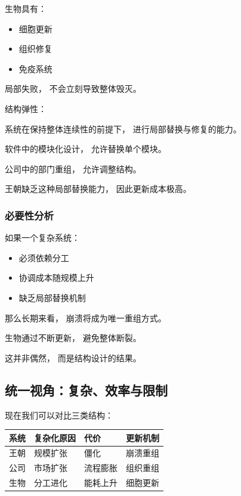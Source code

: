 \documentclass[openany, a4paper, 12pt]{book}
\begin{document}
生物具有：

\begin{itemize}
	\item 细胞更新
	\item 组织修复
	\item 免疫系统
\end{itemize}

局部失败，
不会立刻导致整体毁灭。

\begin{definitionbox}
	结构弹性：
	
	系统在保持整体连续性的前提下，
	进行局部替换与修复的能力。
\end{definitionbox}

软件中的模块化设计，
允许替换单个模块。

公司中的部门重组，
允许调整结构。

王朝缺乏这种局部替换能力，
因此更新成本极高。

\subsubsection{必要性分析}

如果一个复杂系统：

\begin{itemize}
	\item 必须依赖分工
	\item 协调成本随规模上升
	\item 缺乏局部替换机制
\end{itemize}

那么长期来看，
崩溃将成为唯一重组方式。

生物通过不断更新，
避免整体断裂。

这并非偶然，
而是结构设计的结果。

\subsection{统一视角：复杂、效率与限制}

现在我们可以对比三类结构：

\begin{center}
	\begin{tabular}{llll}
		\toprule
		系统 & 复杂化原因 & 代价 & 更新机制 \\
		\midrule
		王朝 & 规模扩张 & 僵化 & 崩溃重组 \\
		公司 & 市场扩张 & 流程膨胀 & 组织重组 \\
		生物 & 分工进化 & 能耗上升 & 细胞更新 \\
		\bottomrule
	\end{tabular}
\end{center}
\end{document}
